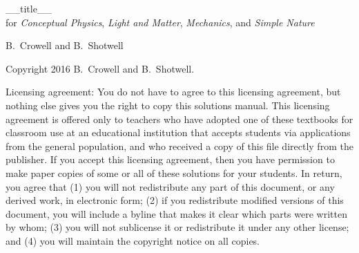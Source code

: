 \begin{titlepage}
	\centering
        {\Huge __title__}\\
        for \emph{Conceptual Physics}, \emph{Light and Matter}, \emph{Mechanics}, and \emph{Simple Nature}


	\vspace{1cm}

        {\Large B.~Crowell and B.~Shotwell}
\end{titlepage}


\noindent Copyright 2016 B.~Crowell and B.~Shotwell.

Licensing agreement: You do not have to agree to this licensing agreement, but nothing
else gives you the right to copy this solutions manual. This licensing agreement is offered only
to teachers who have adopted one of these textbooks for classroom use at an educational institution
that accepts students via applications from the general population, and who received a copy
of this file directly from the publisher. If you accept this licensing
agreement, then you have permission to make paper copies of some or all of these solutions for your
students. In return, you agree that (1) you will not redistribute any part of this document, or any derived work,
in electronic form; (2) if you redistribute modified versions of this document,
you will include a byline that makes it clear which parts were written by whom; (3) you will
not sublicense it or redistribute it under any other license; and (4) you will maintain the
copyright notice on all copies.


\vspace{2cm}

\noindent  

\tableofcontents
